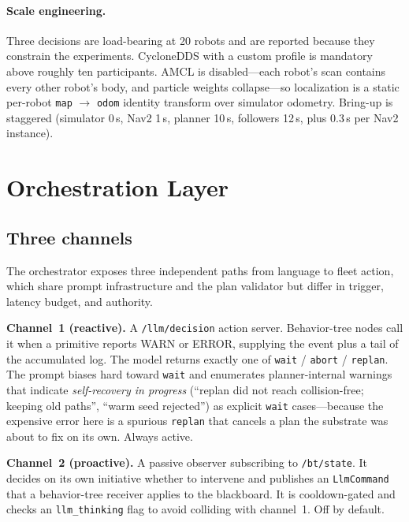 \documentclass[10pt,twocolumn]{article}
\newcommand{\code}[1]{\texttt{\small #1}}
\begin{document}
\paragraph{Scale engineering.}
Three decisions are load-bearing at 20 robots and are reported because they
constrain the experiments. CycloneDDS with a custom profile is mandatory above
roughly ten participants. AMCL is disabled---each robot's scan contains every
other robot's body, and particle weights collapse---so localization is a static
per-robot \code{map} $\rightarrow$ \code{odom} identity transform over simulator
odometry. Bring-up is staggered (simulator 0\,s, Nav2 1\,s, planner 10\,s,
followers 12\,s, plus 0.3\,s per Nav2 instance).

\section{Orchestration Layer}

\subsection{Three channels}
\label{sec:channels}

The orchestrator exposes three independent paths from language to fleet action,
which share prompt infrastructure and the plan validator but differ in trigger,
latency budget, and authority.

\textbf{Channel~1 (reactive).} A \code{/llm/decision} action server. Behavior-tree
nodes call it when a primitive reports WARN or ERROR, supplying the event plus a
tail of the accumulated log. The model returns exactly one of
\code{wait} / \code{abort} / \code{replan}. The prompt biases hard toward
\code{wait} and enumerates planner-internal warnings that indicate
\emph{self-recovery in progress} (``replan did not reach collision-free; keeping
old paths'', ``warm seed rejected'') as explicit \code{wait} cases---because
the expensive error here is a spurious \code{replan} that cancels a plan the
substrate was about to fix on its own. Always active.

\textbf{Channel~2 (proactive).} A passive observer subscribing to
\code{/bt/state}. It decides on its own initiative whether to intervene and
publishes an \code{LlmCommand} that a behavior-tree receiver applies to the
blackboard. It is cooldown-gated and checks an \code{llm\_thinking} flag to
avoid colliding with channel~1. Off by default.
\end{document}
